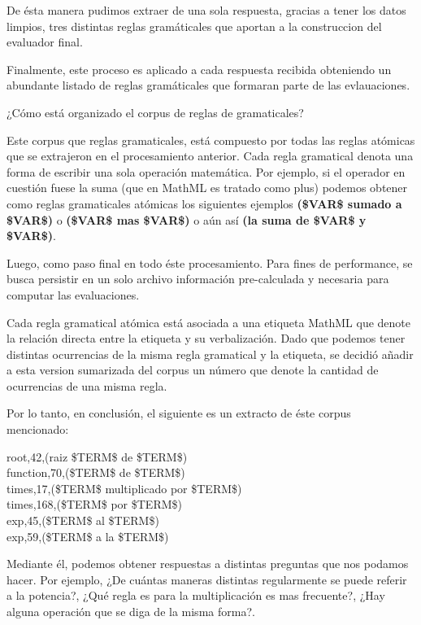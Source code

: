De ésta manera pudimos extraer de una sola respuesta, gracias a tener los datos limpios, tres distintas reglas gramáticales que aportan a la construccion del evaluador final.

Finalmente, este proceso es aplicado a cada respuesta recibida obteniendo un abundante listado de reglas gramáticales que formaran parte de las evlauaciones.

¿Cómo está organizado el corpus de reglas de gramaticales?

Este corpus que reglas gramaticales, está compuesto por todas las reglas atómicas que se extrajeron en el procesamiento anterior. Cada regla gramatical denota una forma de escribir una sola operación matemática. Por ejemplo, si el operador en cuestión fuese la suma (que en MathML es tratado como plus) podemos obtener como reglas gramaticales atómicas los siguientes ejemplos \textbf{(\$VAR\$ sumado a \$VAR\$)} o \textbf{(\$VAR\$ mas \$VAR\$)} o aún así \textbf{(la suma de \$VAR\$ y \$VAR\$)}.

Luego, como paso final en todo éste procesamiento. Para fines de performance, se busca persistir en un solo archivo información pre-calculada y necesaria para computar las evaluaciones.

Cada regla gramatical atómica está asociada a una etiqueta MathML que denote la relación directa entre la etiqueta y su verbalización. Dado que podemos tener distintas ocurrencias de la misma regla gramatical y la etiqueta, se decidió añadir a esta version sumarizada del corpus un número que denote la cantidad de ocurrencias de una misma regla.

Por lo tanto, en conclusión, el siguiente es un extracto de éste corpus mencionado:

\begin{tcolorbox}
root,42,(raiz \$TERM\$ de \$TERM\$)\\
function,70,(\$TERM\$ de \$TERM\$)\\
times,17,(\$TERM\$ multiplicado por \$TERM\$)\\
times,168,(\$TERM\$ por \$TERM\$)\\
exp,45,(\$TERM\$ al \$TERM\$)\\
exp,59,(\$TERM\$ a la \$TERM\$)
\end{tcolorbox}

Mediante él, podemos obtener respuestas a distintas preguntas que nos podamos hacer. Por ejemplo, ¿De cuántas maneras distintas regularmente se puede referir a la potencia?, ¿Qué regla es para la multiplicación es mas frecuente?, ¿Hay alguna operación que se diga de la misma forma?.

